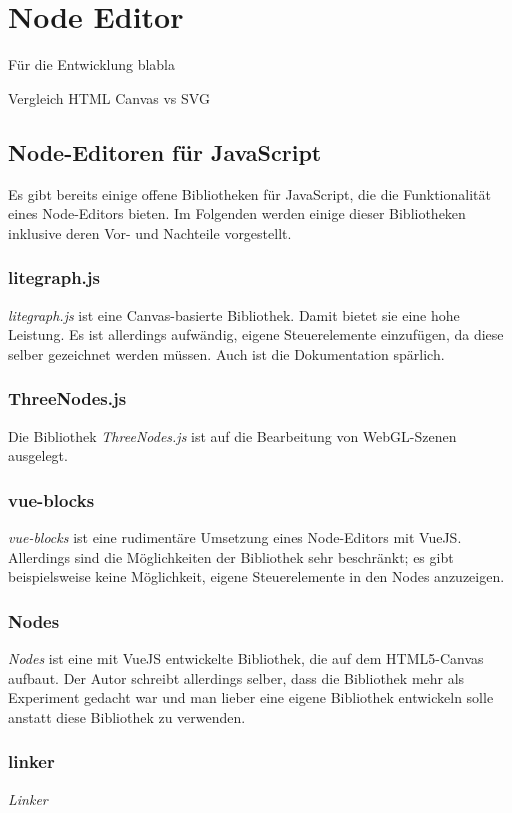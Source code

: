 
\section{Node Editor}

Für die Entwicklung blabla

Vergleich HTML Canvas vs SVG

\subsection{Node-Editoren für JavaScript}

Es gibt bereits einige offene Bibliotheken für JavaScript, die die Funktionalität eines Node-Editors bieten. Im Folgenden werden einige dieser Bibliotheken inklusive deren Vor- und Nachteile vorgestellt.

\subsubsection*{litegraph.js}
\textit{litegraph.js} ist eine Canvas-basierte Bibliothek. Damit bietet sie eine hohe Leistung. Es ist allerdings aufwändig, eigene Steuerelemente einzufügen, da diese selber gezeichnet werden müssen. Auch ist die Dokumentation spärlich.

\subsubsection*{ThreeNodes.js}
Die Bibliothek \textit{ThreeNodes.js} ist auf die Bearbeitung von WebGL-Szenen ausgelegt.

\subsubsection*{vue-blocks}
\textit{vue-blocks} ist eine rudimentäre Umsetzung eines Node-Editors mit VueJS. Allerdings sind die Möglichkeiten der Bibliothek sehr beschränkt; es gibt beispielsweise keine Möglichkeit, eigene Steuerelemente in den Nodes anzuzeigen.

\subsubsection*{Nodes}
\textit{Nodes} ist eine mit VueJS entwickelte Bibliothek, die auf dem HTML5-Canvas aufbaut. Der Autor schreibt allerdings selber, dass die Bibliothek mehr als Experiment gedacht war und man lieber eine eigene Bibliothek entwickeln solle anstatt diese Bibliothek zu verwenden.

\subsubsection*{linker}
\textit{Linker} 
